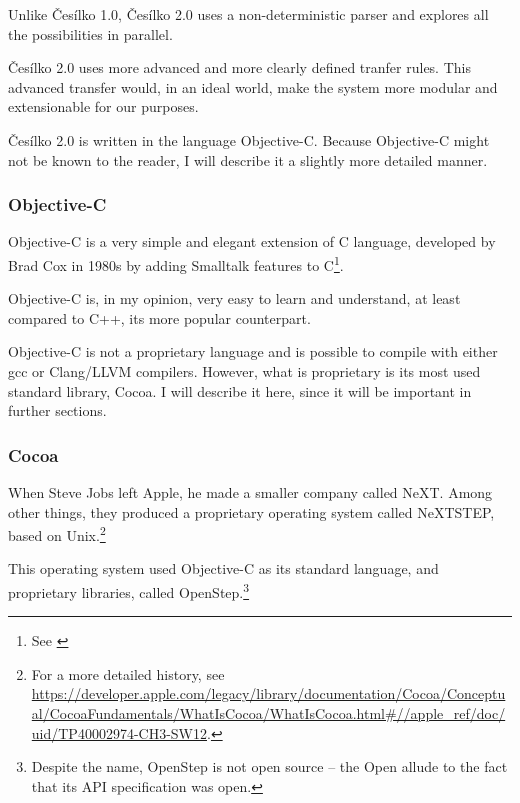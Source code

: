 Unlike Česílko 1.0, Česílko 2.0 uses a non-deterministic parser and explores all the possi\-bi\-li\-ties in parallel. 

Česílko 2.0 uses more advanced and more clearly defined tranfer rules. This advanced transfer would, in an ideal world, make the system more modular and extensionable for our purposes. 


Česílko 2.0 is written in the language Objective-C. Because Objective-C might not be known to the reader, I will describe it a slightly more detailed manner.


\subsubsection{Objective-C}
Objective-C is a very simple and elegant extension of C language, developed by Brad Cox in 1980s by adding Smalltalk features to C\footnote{See \cite{cocoa4}}. 

Objective-C is, in my opinion, very easy to learn and understand, at least compared to C++, its more popular counterpart.

Objective-C is not a proprietary language and is possible to compile with either gcc or Clang/LLVM compilers. However, what is proprietary is its most used standard library, Cocoa.
I will describe it here, since it will be important in further sections.

\subsubsection{Cocoa}
When Steve Jobs left Apple, he made a smaller company called NeXT. Among other things, they produced a proprietary operating system called NeXTSTEP, based on Unix.\footnote{For a more detailed history, see \url{https://developer.apple.com/legacy/library/documentation/Cocoa/Conceptual/CocoaFundamentals/WhatIsCocoa/WhatIsCocoa.html\#//apple\_ref/doc/uid/TP40002974-CH3-SW12}.}

This operating system used Objective-C as its standard language, and proprietary libraries, called OpenStep.\footnote{Despite the name, OpenStep is not open source -- the Open allude to the fact that its API specification was open.}

